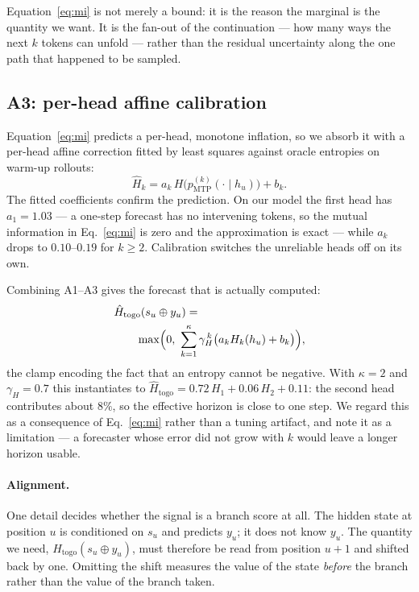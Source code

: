 \documentclass[11pt]{article}
\newcommand{\Htogo}{H_{\mathrm{togo}}}
\begin{document}
Equation~\eqref{eq:mi} is not merely a bound: it is the reason the marginal is the
quantity we want. It is the fan-out of the continuation --- how many ways the next
$k$ tokens can unfold --- rather than the residual uncertainty along the one path
that happened to be sampled.

\subsection{A3: per-head affine calibration}

Equation~\eqref{eq:mi} predicts a per-head, monotone inflation, so we absorb it with
a per-head affine correction fitted by least squares against oracle entropies on
warm-up rollouts:
%
\begin{equation}
\hat{H}_k = a_k\, H\bigl(p^{(k)}_{\mathrm{MTP}}(\cdot \mid h_u)\bigr) + b_k .
\label{eq:a3}
\end{equation}
%
The fitted coefficients confirm the prediction. On our model the first head has
$a_1 = 1.03$ --- a one-step forecast has no intervening tokens, so the mutual
information in Eq.~\eqref{eq:mi} is zero and the approximation is exact --- while
$a_k$ drops to $0.10$--$0.19$ for $k \ge 2$. Calibration switches the unreliable
heads off on its own.

Combining A1--A3 gives the forecast that is actually computed:
%
\begin{equation}
\begin{split}
&\hat{H}_{\mathrm{togo}}(s_u \oplus y_u) =\\
&\qquad \max\Bigl(0,\ \sum_{k=1}^{\kappa} \gamma_H^{\,k}\bigl(a_k H_k(h_u) + b_k\bigr)\Bigr),
\end{split}
\label{eq:forecast}
\end{equation}
%
the clamp encoding the fact that an entropy cannot be negative. With
$\kappa = 2$ and $\gamma_H = 0.7$ this instantiates to
$\hat{H}_{\mathrm{togo}} = 0.72\,H_1 + 0.06\,H_2 + 0.11$: the second head
contributes about $8\%$, so the effective horizon is close to one step. We regard
this as a consequence of Eq.~\eqref{eq:mi} rather than a tuning artifact, and note
it as a limitation --- a forecaster whose error did not grow with $k$ would leave a
longer horizon usable.

\paragraph{Alignment.}
One detail decides whether the signal is a branch score at all. The hidden state at
position $u$ is conditioned on $s_u$ and predicts $y_u$; it does not know $y_u$. The
quantity we need, $\Htogo(s_u \oplus y_u)$, must therefore be read from position
$u+1$ and shifted back by one. Omitting the shift measures the value of the state
\emph{before} the branch rather than the value of the branch taken.
\end{document}
